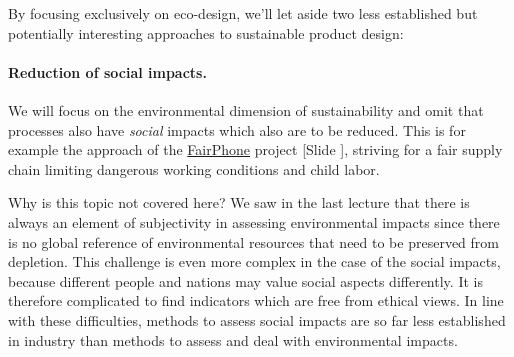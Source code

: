 \documentclass{article}
\newcounter{slide}
\begin{document}
By focusing exclusively on eco-design, we'll let aside two less established but potentially interesting approaches to sustainable product design:

\paragraph{Reduction of social impacts.} We will focus on the environmental dimension of sustainability and omit that processes also have \emph{social} impacts which also are to be reduced. This is for example the approach of the \href{https://www.fairphone.com/en/}{FairPhone} project {\color{blue}[Slide ]}, striving for a fair supply chain limiting dangerous working conditions and child labor. %

Why is this topic not covered here? We saw in the last lecture that there is always an element of subjectivity in assessing environmental impacts since there is no global reference of environmental resources that need to be preserved from depletion. This challenge is even more complex in the case of the social impacts, because different people and nations may value social aspects differently. It is therefore complicated to find indicators which are free from ethical views. In line with these difficulties, methods to assess social impacts are so far less established in industry than methods to assess and deal with environmental impacts. 
\end{document}
